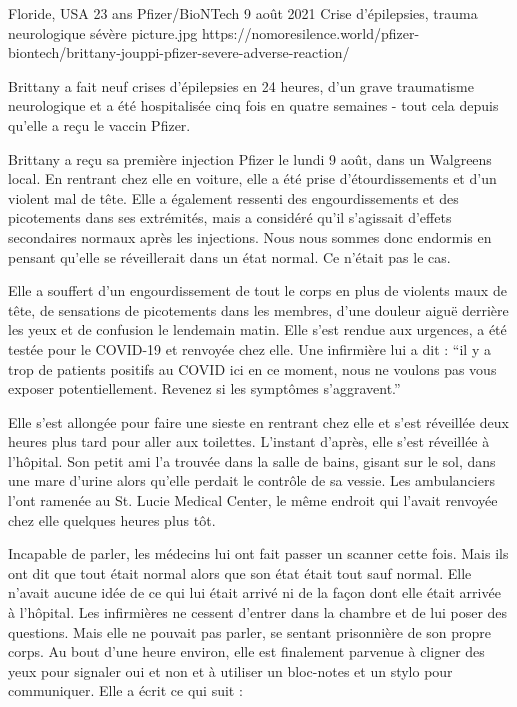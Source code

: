 {Floride, USA}
{23 ans}
{Pfizer/BioNTech}
{9 août 2021}
{Crise d'épilepsies, trauma neurologique sévère}
{picture.jpg}
{https://nomoresilence.world/pfizer-biontech/brittany-jouppi-pfizer-severe-adverse-reaction/}
{

Brittany a fait neuf crises d'épilepsies en 24 heures, d'un grave traumatisme
neurologique et a été hospitalisée cinq fois en quatre semaines - tout cela
depuis qu'elle a reçu le vaccin Pfizer.

Brittany a reçu sa première injection Pfizer le lundi 9 août, dans un Walgreens
local. En rentrant chez elle en voiture, elle a été prise d'étourdissements et
d'un violent mal de tête. Elle a également ressenti des engourdissements et des
picotements dans ses extrémités, mais a considéré qu'il s'agissait d'effets
secondaires normaux après les injections. Nous nous sommes donc endormis en
pensant qu'elle se réveillerait dans un état normal. Ce n'était pas le cas.

Elle a souffert d'un engourdissement de tout le corps en plus de violents maux
de tête, de sensations de picotements dans les membres, d'une douleur aiguë
derrière les yeux et de confusion le lendemain matin. Elle s'est rendue aux
urgences, a été testée pour le COVID-19 et renvoyée chez elle. Une infirmière
lui a dit : “il y a trop de patients positifs au COVID ici en ce moment, nous ne
voulons pas vous exposer potentiellement. Revenez si les symptômes s'aggravent.”

Elle s'est allongée pour faire une sieste en rentrant chez elle et s'est
réveillée deux heures plus tard pour aller aux toilettes. L'instant d'après,
elle s'est réveillée à l'hôpital. Son petit ami l'a trouvée dans la salle de
bains, gisant sur le sol, dans une mare d'urine alors qu'elle perdait le
contrôle de sa vessie. Les ambulanciers l'ont ramenée au St. Lucie Medical
Center, le même endroit qui l'avait renvoyée chez elle quelques heures plus tôt.

Incapable de parler, les médecins lui ont fait passer un scanner cette
fois. Mais ils ont dit que tout était normal alors que son état était tout sauf
normal. Elle n'avait aucune idée de ce qui lui était arrivé ni de la façon dont
elle était arrivée à l'hôpital. Les infirmières ne cessent d'entrer dans la
chambre et de lui poser des questions. Mais elle ne pouvait pas parler, se
sentant prisonnière de son propre corps. Au bout d'une heure environ, elle est
finalement parvenue à cligner des yeux pour signaler oui et non et à utiliser un
bloc-notes et un stylo pour communiquer. Elle a écrit ce qui suit :

}
